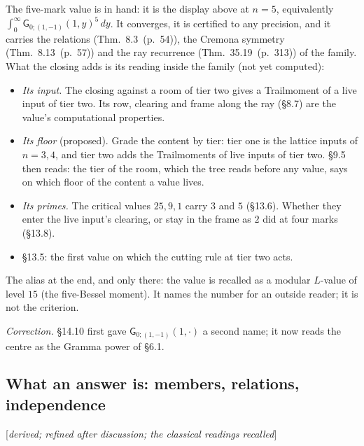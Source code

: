 \documentclass[11pt]{article}
\newcommand{\sG}{\mathsf G}
\newcommand{\status}[1]{\hfill{\small[\textit{#1}]}}
\newcommand{\hb}[2]{#1~(p.~#2)}   %
\theoremstyle{plain}
\theoremstyle{remark}
\begin{document}
The five-mark value is in hand: it is the display above at $n=5$, equivalently $\int_0^\infty\sG_{0;(1,-1)}(1,y)^5\,dy$. It converges, it is certified to any precision, and it carries the relations (Thm.~\hb{8.3}{54}), the Cremona symmetry (Thm.~\hb{8.13}{57}) and the ray recurrence (Thm.~\hb{35.19}{313}) of the family. What the closing adds is its reading inside the family (not yet computed):
\begin{itemize}
\item \emph{Its input.} The closing against a room of tier two gives a Trailmoment of a live input of tier two. Its row, clearing and frame along the ray (\S8.7) are the value's computational properties.
\item \emph{Its floor} (proposed). Grade the content by tier: tier one is the lattice inputs of $n=3,4$, and tier two adds the Trailmoments of live inputs of tier two. \S9.5 then reads: the tier of the room, which the tree reads before any value, says on which floor of the content a value lives.
\item \emph{Its primes.} The critical values $25,9,1$ carry $3$ and $5$ (\S13.6). Whether they enter the live input's clearing, or stay in the frame as $2$ did at four marks (\S13.8).
\item \S13.5: the first value on which the cutting rule at tier two acts.
\end{itemize}
The alias at the end, and only there: the value is recalled as a modular $L$-value of level $15$ (the five-Bessel moment). It names the number for an outside reader; it is not the criterion.

\emph{Correction.} \S14.10 first gave $\sG_{0;(1,-1)}(1,\cdot)$ a second name; it now reads the centre as the Gramma power of \S6.1.

\subsection{What an answer is: members, relations, independence}\status{derived; refined after discussion; the classical readings recalled}
\end{document}
